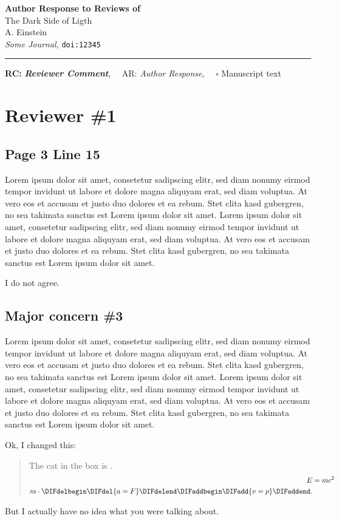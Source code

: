 {\Large\bf Author Response to Reviews of}\\[1em]
{\huge The Dark Side of Ligth}\\[1em]
{A. Einstein}\\
{\it Some Journal, }\texttt{doi:12345}\\
\hrule

\hfill {\bfseries RC:} \textbf{\textit{Reviewer Comment}},\(\quad\) AR: \emph{Author Response}, \(\quad\square\) Manuscript text

\section{Reviewer \#1}

\subsection{Page 3 Line 15}

\RC Lorem ipsum dolor sit amet, consetetur sadipscing elitr, sed diam nonumy eirmod tempor invidunt ut labore et dolore magna aliquyam erat, sed diam voluptua. At vero eos et accusam et justo duo dolores et ea rebum. Stet clita kasd gubergren, no sea takimata sanctus est Lorem ipsum dolor sit amet. Lorem ipsum dolor sit amet, consetetur sadipscing elitr, sed diam nonumy eirmod tempor invidunt ut labore et dolore magna aliquyam erat, sed diam voluptua. At vero eos et accusam et justo duo dolores et ea rebum. Stet clita kasd gubergren, no sea takimata sanctus est Lorem ipsum dolor sit amet.

\AR I do not agree.

\subsection{Major concern \#3}

\RC Lorem ipsum dolor sit amet, consetetur sadipscing elitr, sed diam nonumy eirmod tempor invidunt ut labore et dolore magna aliquyam erat, sed diam voluptua. At vero eos et accusam et justo duo dolores et ea rebum. Stet clita kasd gubergren, no sea takimata sanctus est Lorem ipsum dolor sit amet. Lorem ipsum dolor sit amet, consetetur sadipscing elitr, sed diam nonumy eirmod tempor invidunt ut labore et dolore magna aliquyam erat, sed diam voluptua. At vero eos et accusam et justo duo dolores et ea rebum. Stet clita kasd gubergren, no sea takimata sanctus est Lorem ipsum dolor sit amet.

\AR Ok, I changed this:

\begin{quote}
The cat in the box is \DIFdelbegin {}\DIFdelend \DIFaddbegin {}\DIFaddend .
\begin{align}
E &= mc^2 \\
m\cdot \DIFdelbegin \DIFdel{a=F}\DIFdelend \DIFaddbegin \DIFadd{v=p}\DIFaddend .
\end{align}
\end{quote}

\AR*But I actually have no idea what you were talking about.

